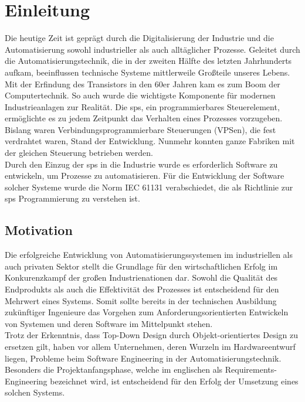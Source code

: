 \documentclass[../../Bachelorarbeit.tex]{subfiles}
\begin{document}
\section{Einleitung}


Die heutige Zeit ist geprägt durch die Digitalisierung der Industrie und die Automatisierung sowohl industrieller als auch alltäglicher Prozesse. Geleitet durch die Automatisierungstechnik, die in der zweiten Hälfte des letzten Jahrhunderts aufkam, beeinflussen technische Systeme mittlerweile Großteile unseres Lebens.\\
Mit der Erfindung des Transistors in den 60er Jahren kam es zum Boom der Computertechnik. So auch wurde die wichtigste Komponente für modernen Industrieanlagen zur Realität. Die \ac{sps}, ein programmierbares Steuerelement, ermöglichte es zu jedem Zeitpunkt das Verhalten eines Prozesses vorzugeben. Bislang waren Verbindungsprogrammierbare Steuerungen (VPSen), die fest verdrahtet waren, Stand der Entwicklung. Nunmehr konnten ganze Fabriken mit der gleichen Steuerung betrieben werden.\\
Durch den Einzug der \acs{sps} in die Industrie wurde es erforderlich Software zu entwickeln, um Prozesse zu automatisieren. Für die Entwicklung der Software solcher Systeme wurde die Norm IEC 61131 verabschiedet, die als Richtlinie zur \acs{sps} Programmierung zu verstehen ist.

\subsection{Motivation}
Die erfolgreiche Entwicklung von Automatisierungssystemen im industriellen als auch privaten Sektor stellt die Grundlage für den wirtschaftlichen Erfolg im Konkurenzkampf der großen Industrienationen dar. Sowohl die Qualität des Endprodukts als auch die Effektivität des Prozesses ist entscheidend für den Mehrwert eines Systems. Somit sollte bereits in der technischen Ausbildung zukünftiger Ingenieure das Vorgehen zum Anforderungsorientierten Entwickeln von Systemen und deren Software im Mittelpunkt stehen.\\
Trotz der Erkenntnis, dass Top-Down Design durch Objekt-orientiertes Design zu ersetzen gilt, haben vor allem Unternehmen, deren Wurzeln im Hardwareentwurf liegen, Probleme beim Software Engineering in der Automatisierungstechnik. Besonders die Projektanfangsphase, welche im englischen als Requirements-Engineering bezeichnet wird, ist entscheidend für den Erfolg der Umsetzung eines solchen Systems.
\end{document}
